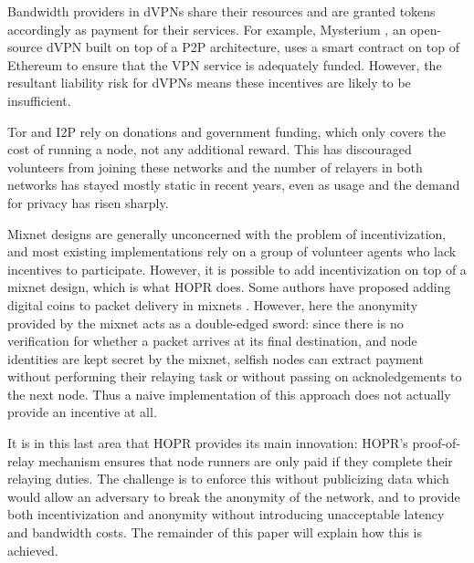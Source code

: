 Bandwidth providers in dVPNs share their resources and are granted tokens accordingly as payment for their services. For example, Mysterium \cite{mysterium}, an open-source dVPN built on top of a P2P architecture, uses a smart contract on top of Ethereum to ensure that the VPN service is adequately funded. However, the resultant liability risk for dVPNs means these incentives are likely to be insufficient.

Tor and I2P rely on donations and government funding, which only covers the cost of running a node, not any additional reward. This has discouraged volunteers from joining these networks and the number of relayers in both networks has stayed mostly static in recent years, even as usage and the demand for privacy has risen sharply.

Mixnet designs are generally unconcerned with the problem of incentivization, and most existing implementations rely on a group of volunteer agents who lack incentives to participate. However, it is possible to add incentivization on top of a mixnet design, which is what HOPR does. Some authors have proposed adding digital coins to packet delivery in mixnets \cite{MixnetCoins}. However, here the anonymity provided by the mixnet acts as a double-edged sword: since there is no verification for whether a packet arrives at its final destination, and node identities are kept secret by the mixnet, selfish nodes can extract payment without performing their relaying task or without passing on acknoledgements to the next node. Thus a naive implementation of this approach does not actually provide an incentive at all.

It is in this last area that HOPR provides its main innovation: HOPR's proof-of-relay mechanism ensures that node runners are only paid if they complete their relaying duties. The challenge is to enforce this without publicizing data which would allow an adversary to break the anonymity of the network, and to provide both incentivization and anonymity without introducing unacceptable latency and bandwidth costs. The remainder of this paper will explain how this is achieved.
